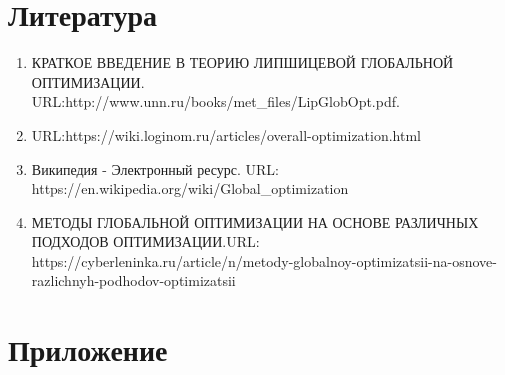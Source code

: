 \documentclass{report}
\begin{document}
\section*{Литература}
\begin{enumerate}
\item КРАТКОЕ ВВЕДЕНИЕ В ТЕОРИЮ ЛИПШИЦЕВОЙ ГЛОБАЛЬНОЙ ОПТИМИЗАЦИИ. URL:http://www.unn.ru/books/met\_files/LipGlobOpt.pdf.
\item URL:https://wiki.loginom.ru/articles/overall-optimization.html
\item Википедия - Электронный ресурс. URL: https://en.wikipedia.org/wiki/Global\_optimization
\item МЕТОДЫ ГЛОБАЛЬНОЙ ОПТИМИЗАЦИИ НА ОСНОВЕ РАЗЛИЧНЫХ ПОДХОДОВ ОПТИМИЗАЦИИ.URL: https://cyberleninka.ru/article/n/metody-globalnoy-optimizatsii-na-osnove-razlichnyh-podhodov-optimizatsii
\end{enumerate}
\newpage

\section*{Приложение}
\end{document}
